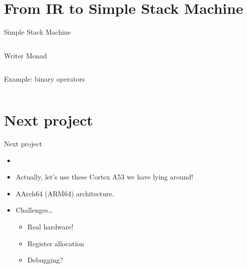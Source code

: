 \documentclass[department=icis, slidenumbers=slide, official=true]{beamerruhuisstijl}
\begin{document}
\section{From IR to Simple Stack Machine}
\begin{frame}{Simple Stack Machine}
    \fontsize{8pt}{9}\selectfont


    \begin{multicols}{3}
        \inputminted{Haskell}{examples/ssm.hs}
    \end{multicols}

\end{frame}

\begin{frame}{Writer Monad}
    \inputminted{Haskell}{examples/ssm_monad.hs}
\end{frame}

\begin{frame}{Example: binary operators}
    \fontsize{8pt}{9}\selectfont
    \inputminted{Haskell}{examples/binop_to_ssm.hs}
\end{frame}

\section{Next project}
\begin{frame}{Next project}
    \begin{itemize}[<+->]
        \item
        \item
            Actually, let's use these Cortex A53 we have lying around!
        \item
            AArch64 (ARM64) architecture.
        \item
            Challenges\ldots
            \begin{itemize}[<+->]
                \item Real hardware!
                \item Register allocation
                \item Debugging?
            \end{itemize}
    \end{itemize}
\end{frame}
\end{document}
